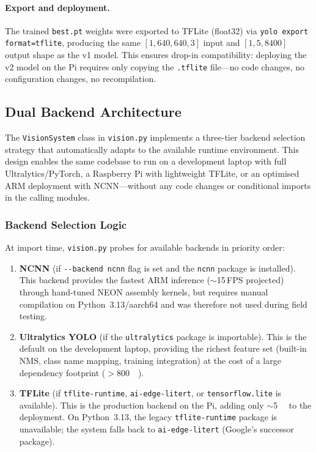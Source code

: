 \paragraph{Export and deployment.}
The trained \texttt{best.pt} weights were exported to TFLite (float32) via \texttt{yolo export format=tflite}, producing the same $[1, 640, 640, 3]$ input and $[1, 5, 8400]$ output shape as the v1 model.  This ensures drop-in compatibility: deploying the v2 model on the Pi requires only copying the \texttt{.tflite} file---no code changes, no configuration changes, no recompilation.

\subsection{Dual Backend Architecture}\label{app:cv:backends}

The \texttt{VisionSystem} class in \texttt{vision.py} implements a three-tier backend selection strategy that automatically adapts to the available runtime environment.  This design enables the same codebase to run on a development laptop with full Ultralytics/PyTorch, a Raspberry Pi with lightweight TFLite, or an optimised ARM deployment with NCNN---without any code changes or conditional imports in the calling modules.

\subsubsection{Backend Selection Logic}

At import time, \texttt{vision.py} probes for available backends in priority order:

\begin{enumerate}
    \item \textbf{NCNN} (if \texttt{-{}-backend ncnn} flag is set and the \texttt{ncnn} package is installed).  This backend provides the fastest ARM inference (${\sim}$15\,FPS projected) through hand-tuned NEON assembly kernels, but requires manual compilation on Python~3.13/aarch64 and was therefore not used during field testing.
    \item \textbf{Ultralytics YOLO} (if the \texttt{ultralytics} package is importable).  This is the default on the development laptop, providing the richest feature set (built-in NMS, class name mapping, training integration) at the cost of a large dependency footprint ($>$\SI{800}{\mega\byte}).
    \item \textbf{TFLite} (if \texttt{tflite-runtime}, \texttt{ai-edge-litert}, or \texttt{tensorflow.lite} is available).  This is the production backend on the Pi, adding only ${\sim}$\SI{5}{\mega\byte} to the deployment.  On Python~3.13, the legacy \texttt{tflite-runtime} package is unavailable; the system falls back to \texttt{ai-edge-litert} (Google's successor package).
\end{enumerate}

